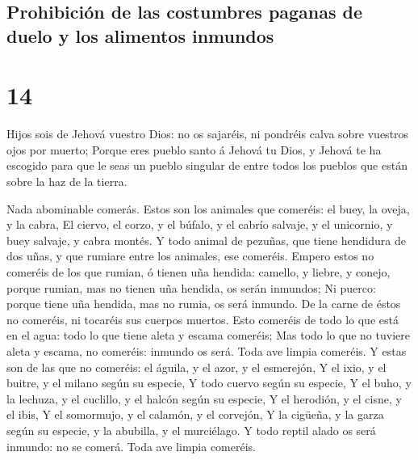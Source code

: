 \hypertarget{prohibiciuxf3n-de-las-costumbres-paganas-de-duelo-y-los-alimentos-inmundos}{%
\subsection{Prohibición de las costumbres paganas de duelo y los
alimentos
inmundos}\label{prohibiciuxf3n-de-las-costumbres-paganas-de-duelo-y-los-alimentos-inmundos}}

\hypertarget{section-13}{%
\section{14}\label{section-13}}

 Hijos sois de Jehová vuestro Dios: no os sajaréis, ni
pondréis calva sobre vuestros ojos por muerto;  Porque
eres pueblo santo á Jehová tu Dios, y Jehová te ha escogido para que le
seas un pueblo singular de entre todos los pueblos que están sobre la
haz de la tierra.

 Nada abominable comerás.  Estos son los
animales que comeréis: el buey, la oveja, y la cabra,  El
ciervo, el corzo, y el búfalo, y el cabrío salvaje, y el unicornio, y
buey salvaje, y cabra montés.  Y todo animal de pezuñas,
que tiene hendidura de dos uñas, y que rumiare entre los animales, ese
comeréis.  Empero estos no comeréis de los que rumian, ó
tienen uña hendida: camello, y liebre, y conejo, porque rumian, mas no
tienen uña hendida, os serán inmundos;  Ni puerco: porque
tiene uña hendida, mas no rumia, os será inmundo. De la carne de éstos
no comeréis, ni tocaréis sus cuerpos muertos.  Esto
comeréis de todo lo que está en el agua: todo lo que tiene aleta y
escama comeréis;  Mas todo lo que no tuviere aleta y
escama, no comeréis: inmundo os será.  Toda ave limpia
comeréis.  Y estas son de las que no comeréis: el águila,
y el azor, y el esmerejón,  Y el ixio, y el buitre, y el
milano según su especie,  Y todo cuervo según su especie,
 Y el buho, y la lechuza, y el cuclillo, y el halcón
según su especie,  Y el herodión, y el cisne, y el ibis,
 Y el somormujo, y el calamón, y el corvejón,
 Y la cigüeña, y la garza según su especie, y la
abubilla, y el murciélago.  Y todo reptil alado os será
inmundo: no se comerá.  Toda ave limpia comeréis.

